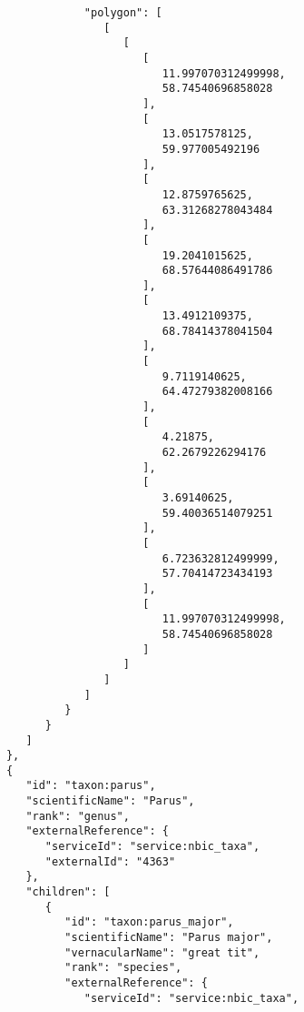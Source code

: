 \documentclass[10pt,letterpaper]{article}
\begin{document}
\begin{verbatim}
                        "polygon": [
                           [
                              [
                                 [
                                    11.997070312499998,
                                    58.74540696858028
                                 ],
                                 [
                                    13.0517578125,
                                    59.977005492196
                                 ],
                                 [
                                    12.8759765625,
                                    63.31268278043484
                                 ],
                                 [
                                    19.2041015625,
                                    68.57644086491786
                                 ],
                                 [
                                    13.4912109375,
                                    68.78414378041504
                                 ],
                                 [
                                    9.7119140625,
                                    64.47279382008166
                                 ],
                                 [
                                    4.21875,
                                    62.2679226294176
                                 ],
                                 [
                                    3.69140625,
                                    59.40036514079251
                                 ],
                                 [
                                    6.723632812499999,
                                    57.70414723434193
                                 ],
                                 [
                                    11.997070312499998,
                                    58.74540696858028
                                 ]
                              ]
                           ]
                        ]
                     }
                  }
               ]
            },
            {
               "id": "taxon:parus",
               "scientificName": "Parus",
               "rank": "genus",
               "externalReference": {
                  "serviceId": "service:nbic_taxa",
                  "externalId": "4363"
               },
               "children": [
                  {
                     "id": "taxon:parus_major",
                     "scientificName": "Parus major",
                     "vernacularName": "great tit",
                     "rank": "species",
                     "externalReference": {
                        "serviceId": "service:nbic_taxa",

\end{verbatim}
\end{document}
